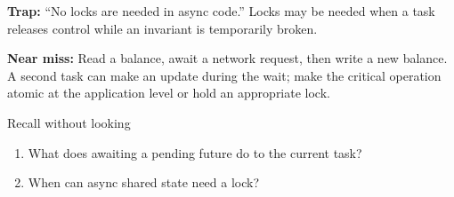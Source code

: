 \documentclass[11pt]{article}
\begin{document}
\begin{keepsection}
\begin{notebox}\textbf{Trap:} “No locks are needed in async code.” Locks may be needed when a task releases control while an invariant is temporarily broken.\end{notebox}

\begin{notebox}\textbf{Near miss:} Read a balance, await a network request, then write a new balance. A second task can make an update during the wait; make the critical operation atomic at the application level or hold an appropriate lock.\end{notebox}

\begin{recallbox}{Recall without looking}
\begin{enumerate}
\item What does awaiting a pending future do to the current task?
\item When can async shared state need a lock?
\end{enumerate}

\end{recallbox}
\end{keepsection}
\end{document}
